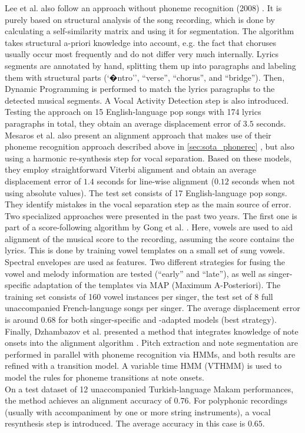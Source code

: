 Lee et al. also follow an approach without phoneme recognition (2008) \cite{LeeC08}. It is purely based on structural analysis of the song recording, which is done by calculating a self-similarity matrix and using it for segmentation. The algorithm takes structural a-priori knowledge into account, e.g. the fact that choruses usually occur most frequently and do not differ very much internally. Lyrics segments are annotated by hand, splitting them up into paragraphs and labeling them with structural parts (`�ntro'', ``verse'', ``chorus'', and ``bridge''). Then, Dynamic Programming is performed to match the lyrics paragraphs to the detected musical segments. A Vocal Activity Detection step is also introduced. Testing the approach on 15 English-language pop songs with 174 lyrics paragraphs in total, they obtain an average displacement error of $3.5$ seconds.\\ %

Mesaros et al. also present an alignment approach that makes use of their phoneme recognition approach described above in \ref{sec:sota_phonerec} \cite{mesaros_alignment}, but also using a harmonic re-synthesis step for vocal separation. Based on these models, they employ straightforward Viterbi alignment and obtain an average displacement error of $1.4$ seconds for line-wise alignment ($0.12$ seconds when not using absolute values). The test set consists of 17 English-language pop songs. They identify mistakes in the vocal separation step as the main source of error.\\ %

Two specialized approaches were presented in the past two years. The first one is part of a score-following algorithm by Gong et al. \cite{gong_alignment}. Here, vowels are used to aid alignment of the musical score to the recording, assuming the score contains the lyrics. This is done by training vowel templates on a small set of sung vowels. Spectral envelopes are used as features. Two different strategies for fusing the vowel and melody information are tested (``early'' and ``late''), as well as singer-specific adaptation of the templates via MAP (Maximum A-Posteriori). The training set consists of 160 vowel instances per singer, the test set of 8 full unaccompanied French-language songs per singer.  The average displacement error is around $0.68$ for both singer-specific and -adapted models (best strategy).\\

Finally, Dzhambazov et al. presented a method that integrates knowledge of note onsets into the alignment algorithm \cite{dzhambazov_alignment}. Pitch extraction and note segmentation are performed in parallel with phoneme recognition via HMMs, and both results are refined with a transition model. A variable time HMM (VTHMM) is used to model the rules for phoneme transitions at note onsets.\\
On a test dataset of 12 unaccompanied Turkish-language Makam performances, the method achieves an alignment accuracy of $0.76$. For polyphonic recordings (usually with accompaniment by one or more string instruments), a vocal resynthesis step is introduced. The average accuracy in this case is $0.65$.



